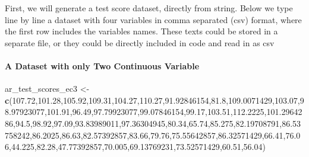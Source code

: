 \documentclass[
]{book}
\newenvironment{Shaded}{\begin{snugshade}}{\end{snugshade}}
\newcommand{\FloatTok}[1]{\textcolor[rgb]{0.00,0.00,0.81}{#1}}
\newcommand{\KeywordTok}[1]{\textcolor[rgb]{0.13,0.29,0.53}{\textbf{#1}}}
\newcommand{\NormalTok}[1]{#1}
\newcommand{\StringTok}[1]{\textcolor[rgb]{0.31,0.60,0.02}{#1}}
\begin{document}
First, we will generate a test score dataset, directly from string. Below we type line by line a dataset with four variables in comma separated (csv) format, where the first row includes the variables names. These texts could be stored in a separate file, or they could be directly included in code and read in as csv

\hypertarget{a-dataset-with-only-two-continuous-variable}{%
\paragraph{A Dataset with only Two Continuous Variable}\label{a-dataset-with-only-two-continuous-variable}}

\begin{Shaded}
\begin{Highlighting}[]
\NormalTok{ar_test_scores_ec3 <-}\StringTok{ }\KeywordTok{c}\NormalTok{(}\FloatTok{107.72}\NormalTok{,}\FloatTok{101.28}\NormalTok{,}\FloatTok{105.92}\NormalTok{,}\FloatTok{109.31}\NormalTok{,}\FloatTok{104.27}\NormalTok{,}\FloatTok{110.27}\NormalTok{,}\FloatTok{91.92846154}\NormalTok{,}\FloatTok{81.8}\NormalTok{,}\FloatTok{109.0071429}\NormalTok{,}\FloatTok{103.07}\NormalTok{,}\FloatTok{98.97923077}\NormalTok{,}\FloatTok{101.91}\NormalTok{,}\FloatTok{96.49}\NormalTok{,}\FloatTok{97.79923077}\NormalTok{,}\FloatTok{99.07846154}\NormalTok{,}\FloatTok{99.17}\NormalTok{,}\FloatTok{103.51}\NormalTok{,}\FloatTok{112.2225}\NormalTok{,}\FloatTok{101.2964286}\NormalTok{,}\FloatTok{94.5}\NormalTok{,}\FloatTok{98.92}\NormalTok{,}\FloatTok{97.09}\NormalTok{,}\FloatTok{93.83989011}\NormalTok{,}\FloatTok{97.36304945}\NormalTok{,}\FloatTok{80.34}\NormalTok{,}\FloatTok{65.74}\NormalTok{,}\FloatTok{85.275}\NormalTok{,}\FloatTok{82.19708791}\NormalTok{,}\FloatTok{86.53758242}\NormalTok{,}\FloatTok{86.2025}\NormalTok{,}\FloatTok{86.63}\NormalTok{,}\FloatTok{82.57392857}\NormalTok{,}\FloatTok{83.66}\NormalTok{,}\FloatTok{79.76}\NormalTok{,}\FloatTok{75.55642857}\NormalTok{,}\FloatTok{86.32571429}\NormalTok{,}\FloatTok{66.41}\NormalTok{,}\FloatTok{76.06}\NormalTok{,}\FloatTok{44.225}\NormalTok{,}\FloatTok{82.28}\NormalTok{,}\FloatTok{47.77392857}\NormalTok{,}\FloatTok{70.005}\NormalTok{,}\FloatTok{69.13769231}\NormalTok{,}\FloatTok{73.52571429}\NormalTok{,}\FloatTok{60.51}\NormalTok{,}\FloatTok{56.04}\NormalTok{)}

\end{Highlighting}
\end{Shaded}
\end{document}

